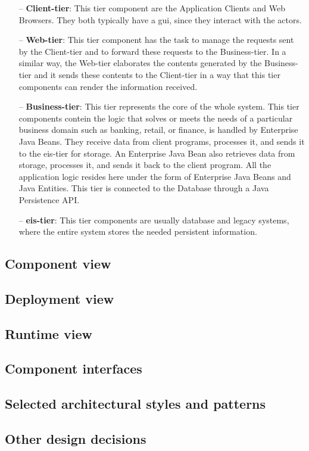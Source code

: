 \begin{itemize}

\item[--]\textbf{Client-tier}: This tier component are the Application Clients and Web Browsers. They both typically have a \acs{gui}, since they interact with the actors.

\item[--]\textbf{Web-tier}: This tier component has the task to manage the requests sent by the Client-tier and to forward these requests to the Business-tier. In a similar way, the Web-tier elaborates the contents generated by the Business-tier and it sends these contents to the Client-tier in a way that this tier components can render the information received.

\item[--]\textbf{Business-tier}: This tier represents the core of the whole system. This tier components contein the logic that solves or meets the needs of a particular business domain such as banking, retail, or finance, is handled by Enterprise Java Beans. They receive data from client programs, processes it, and sends it to the \acs{eis}-tier for storage. An Enterprise Java Bean also retrieves data from storage, processes it, and sends it back to the client program.
All the application logic resides here under the form of Enterprise Java Beans and Java Entities. This tier is connected to the Database through a Java Persistence API.

\item[--]\textbf{\acs{eis}-tier}: This tier components are usually database and legacy systems, where the entire system stores the needed persistent information.

\end{itemize}

\subsection{Component view} \label{subsec:comp-view}

\subsection{Deployment view} \label{subsec:depl-view}

\subsection{Runtime view} \label{run-view}

\subsection{Component interfaces} \label{comp-inter}

\subsection{Selected architectural styles and patterns} \label{arch-styles}

\subsection{Other design decisions} \label{other-des}
